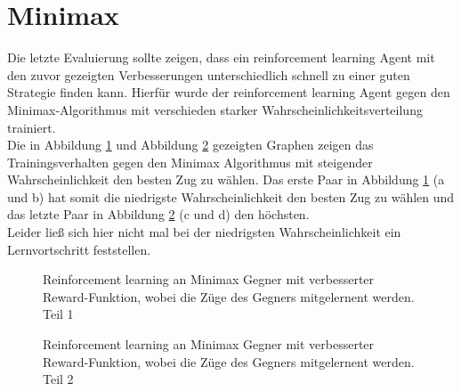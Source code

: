 \section{Minimax}
Die letzte Evaluierung sollte zeigen, dass ein reinforcement learning Agent mit den zuvor gezeigten Verbesserungen unterschiedlich schnell zu einer guten Strategie finden kann. 
Hierfür wurde der reinforcement learning Agent gegen den Minimax-Algorithmus mit verschieden starker Wahrscheinlichkeitsverteilung trainiert.\\
Die in Abbildung \ref{fig:MiniMaxReward1} und Abbildung \ref{fig:MiniMaxReward2} gezeigten Graphen zeigen das Trainingsverhalten gegen den Minimax Algorithmus mit steigender Wahrscheinlichkeit den besten Zug zu wählen. Das erste Paar in Abbildung \ref{fig:MiniMaxReward1} (a und b) hat somit die niedrigste Wahrscheinlichkeit den besten Zug zu wählen und das letzte Paar in Abbildung \ref{fig:MiniMaxReward2} (c und d) den höchsten.\\
Leider ließ sich hier nicht mal bei der niedrigsten Wahrscheinlichkeit ein Lernvortschritt feststellen. 

\begin{figure}%
    \centering
    \qquad
    \qquad
    \qquad
    \qquad
    \qquad
    \qquad
    \qquad
    \caption{Reinforcement learning an Minimax Gegner mit verbesserter Reward-Funktion, wobei die Züge des Gegners mitgelernent werden. Teil 1}%
    \label{fig:MiniMaxReward1}%
\end{figure}
\begin{figure}%
    \centering
    \qquad
    \qquad
    \qquad
    \caption{Reinforcement learning an Minimax Gegner mit verbesserter Reward-Funktion, wobei die Züge des Gegners mitgelernent werden. Teil 2}%
    \label{fig:MiniMaxReward2}%
\end{figure}






